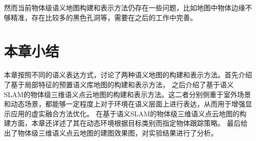 然而当前物体级语义地图构建和表示方法仍存在一些问题，比如地图中物体边缘不够精准，存在比较多的黑色孔洞等，需要在之后的工作中完善。

\section{本章小结}
本章按照不同的语义表达方式，讨论了两种语义地图的构建和表示方法。首先介绍了基于局部特征的预置语义库地图的构建和表示方法，
之后介绍了基于语义SLAM的物体级三维语义点云地图的构建和表示方法。这二者分别侧重于室外场景和动态场景，都能够一定程度上对于环境在语义层面上进行表达，从而用于增强显示应用的虚实融合方法优化。
在基于语义SLAM的物体级三维语义点云地图的构建方面，本章还详述了其在动态环境根据目标类别而指定物体跟踪策略。
最后给出了物体级三维语义点云地图的建图效果图，对实验结果进行了分析。